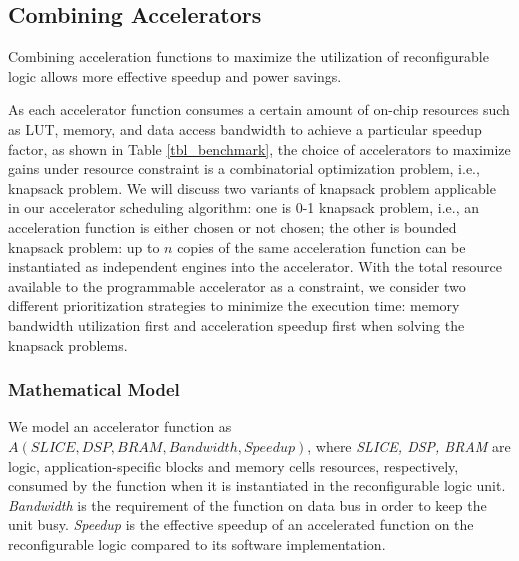 \subsection{Combining Accelerators}
\label{subsec_combo}



Combining acceleration functions to maximize the utilization of reconfigurable logic
allows more effective speedup and power savings.

As each accelerator function consumes a certain amount of
on-chip resources such as LUT, memory, and data access
bandwidth to achieve a particular speedup factor, as shown in Table
\ref{tbl_benchmark}, the choice of accelerators to maximize gains
under resource constraint is a combinatorial optimization problem, i.e., knapsack problem. We will discuss two variants of knapsack problem
applicable in our accelerator scheduling algorithm: one is 0-1
knapsack problem, i.e., an acceleration function is either chosen or not
chosen;  the other is bounded knapsack problem: up to $n$ copies of
the same acceleration function can be instantiated as independent
engines into the accelerator. With the total resource available to the programmable accelerator as
a constraint, we consider two different prioritization strategies to minimize the
execution time: memory bandwidth utilization first and acceleration
speedup first when solving the knapsack problems.

\subsubsection{Mathematical Model}

We model an accelerator function as $A(SLICE, DSP, BRAM, Bandwidth, Speedup)$,
where {\em SLICE, DSP, BRAM} are logic, application-specific blocks and
memory cells resources, respectively, consumed by the function when it is
instantiated in the reconfigurable logic unit. {\em Bandwidth} is the
requirement of the function on data bus in order to keep the unit
busy. {\em Speedup} is the effective speedup of an accelerated function on the
reconfigurable logic compared to its software implementation. 

